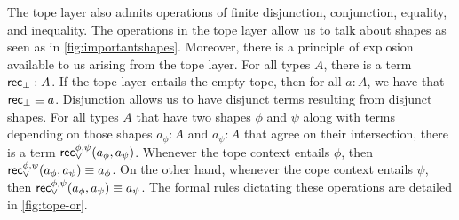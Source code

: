 \documentclass[main.tex]{subfiles}
\begin{document}
The tope layer also admits operations of finite disjunction, conjunction, equality, and inequality. The 
operations in the tope layer allow us to talk about shapes as seen as in \cref{fig:importantshapes}. Moreover, there is a principle of explosion available to us arising from the tope layer. For all types $A$, there is a term $\normalfont \mathsf{rec}_\bot : A$. If the tope layer entails the empty tope, then for all $a : A$, we have that $\normalfont \mathsf{rec}_\bot \equiv a$. Disjunction allows us to have disjunct terms resulting from disjunct shapes. For all types $A$ that have two shapes $\phi$ and $\psi$ along with terms depending on those shapes $a_\phi : A$ and $a_\psi : A$ that agree on their intersection, there is a term $\mathsf{rec}_{\lor}^{\phi,\psi}(a_\phi, a_\psi)$. Whenever the tope context entails $\phi$, then $\mathsf{rec}_{\lor}^{\phi,\psi}(a_\phi, a_\psi) \equiv a_\phi$. On the other hand, whenever the cope context entails $\psi$, then $\mathsf{rec}_{\lor}^{\phi,\psi}(a_\phi, a_\psi) \equiv a_\psi$. The formal rules dictating these operations are detailed in \cref{fig:tope-or}.


\ifSubfilesClassLoaded{%
    
    
}{}
\end{document}
